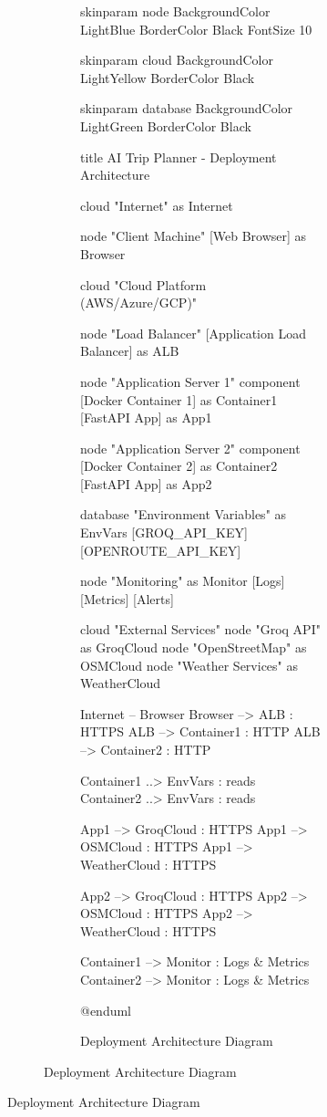 \documentclass[12pt,a4paper]{report}
\begin{document}
\begin{figure}[H]
\begin{plantuml}
\begin{figure}[H]
\begin{plantuml}
\begin{figure}[H]
\begin{plantuml}
skinparam node {
    BackgroundColor LightBlue
    BorderColor Black
    FontSize 10
}

skinparam cloud {
    BackgroundColor LightYellow
    BorderColor Black
}

skinparam database {
    BackgroundColor LightGreen
    BorderColor Black
}

title AI Trip Planner - Deployment Architecture

cloud "Internet" as Internet

node "Client Machine" {
    [Web Browser] as Browser
}

cloud "Cloud Platform (AWS/Azure/GCP)" {
    node "Load Balancer" {
        [Application Load Balancer] as ALB
    }
    
    node "Application Server 1" {
        component [Docker Container 1] as Container1 {
            [FastAPI App] as App1
        }
    }
    
    node "Application Server 2" {
        component [Docker Container 2] as Container2 {
            [FastAPI App] as App2
        }
    }
    
    database "Environment Variables" as EnvVars {
        [GROQ_API_KEY]
        [OPENROUTE_API_KEY]
    }
    
    node "Monitoring" as Monitor {
        [Logs]
        [Metrics]
        [Alerts]
    }
}

cloud "External Services" {
    node "Groq API" as GroqCloud
    node "OpenStreetMap" as OSMCloud
    node "Weather Services" as WeatherCloud
}

Internet -- Browser
Browser --> ALB : HTTPS
ALB --> Container1 : HTTP
ALB --> Container2 : HTTP

Container1 ..> EnvVars : reads
Container2 ..> EnvVars : reads

App1 --> GroqCloud : HTTPS
App1 --> OSMCloud : HTTPS
App1 --> WeatherCloud : HTTPS

App2 --> GroqCloud : HTTPS
App2 --> OSMCloud : HTTPS
App2 --> WeatherCloud : HTTPS

Container1 --> Monitor : Logs & Metrics
Container2 --> Monitor : Logs & Metrics

@enduml
    \end{plantuml}
    \caption{Deployment Architecture Diagram}
    \label{fig:deployment-arch}
\end{figure}



\end{plantuml}
\end{figure}
\end{plantuml}
\end{figure}
\end{document}
